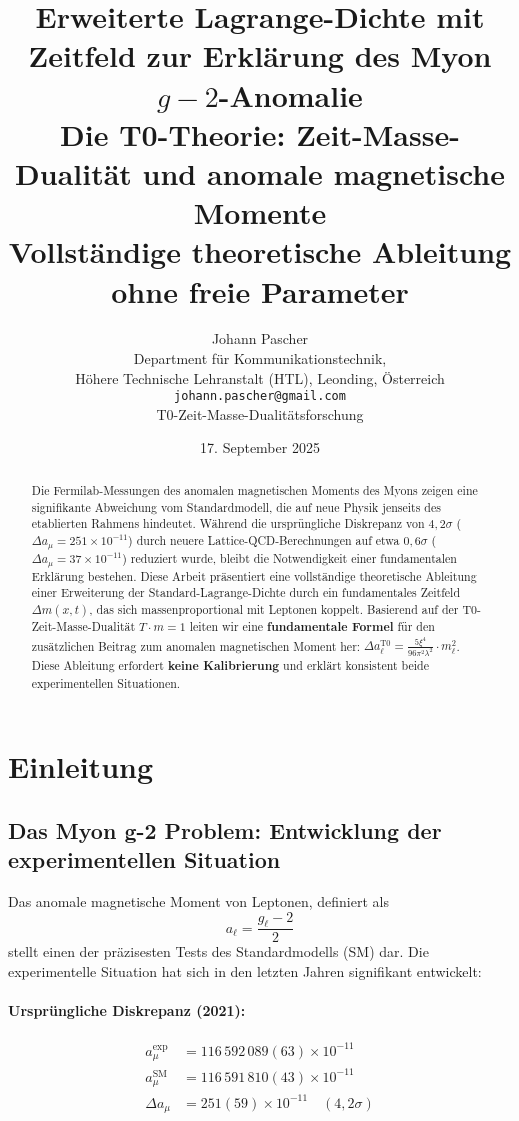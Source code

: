 \documentclass[12pt,a4paper]{article}
\title{\textbf{Erweiterte Lagrange-Dichte mit Zeitfeld zur Erklärung des Myon \(g-2\)-Anomalie}\\[0.5cm]
	\large Die T0-Theorie: Zeit-Masse-Dualität und anomale magnetische Momente\\[0.3cm]
	\normalsize Vollständige theoretische Ableitung ohne freie Parameter}
\author{Johann Pascher\\
	\small Department für Kommunikationstechnik,\\
	\small Höhere Technische Lehranstalt (HTL), Leonding, Österreich\\
	\small \texttt{johann.pascher@gmail.com}\\
	\small T0-Zeit-Masse-Dualitätsforschung}
\date{17. September 2025}
\theoremstyle{definition}
\begin{document}
	\maketitle
	\thispagestyle{fancy}
	
	\begin{abstract}
		Die Fermilab-Messungen des anomalen magnetischen Moments des Myons zeigen eine signifikante Abweichung vom Standardmodell, die auf neue Physik jenseits des etablierten Rahmens hindeutet. Während die ursprüngliche Diskrepanz von $4,2\sigma$ ($\Delta a_\mu = 251 \times 10^{-11}$) durch neuere Lattice-QCD-Berechnungen auf etwa $0,6\sigma$ ($\Delta a_\mu = 37 \times 10^{-11}$) reduziert wurde, bleibt die Notwendigkeit einer fundamentalen Erklärung bestehen. Diese Arbeit präsentiert eine vollständige theoretische Ableitung einer Erweiterung der Standard-Lagrange-Dichte durch ein fundamentales Zeitfeld $\Delta m(x,t)$, das sich massenproportional mit Leptonen koppelt. Basierend auf der T0-Zeit-Masse-Dualität $T \cdot m = 1$ leiten wir eine \textbf{fundamentale Formel} für den zusätzlichen Beitrag zum anomalen magnetischen Moment her: $\Delta a_\ell^{\text{T0}} = \frac{5\xi^4}{96\pi^2\lambda^2} \cdot m_\ell^2$. Diese Ableitung erfordert \textbf{keine Kalibrierung} und erklärt konsistent beide experimentellen Situationen.
	\end{abstract}
	
	\section{Einleitung}
	
	\subsection{Das Myon g-2 Problem: Entwicklung der experimentellen Situation}
	
	Das anomale magnetische Moment von Leptonen, definiert als
	\begin{equation}
		a_\ell = \frac{g_\ell - 2}{2}
	\end{equation}
	stellt einen der präzisesten Tests des Standardmodells (SM) dar. Die experimentelle Situation hat sich in den letzten Jahren signifikant entwickelt:
	
	\paragraph{Ursprüngliche Diskrepanz (2021):}
	\begin{align}
		a_\mu^{\text{exp}} &= 116\,592\,089(63) \times 10^{-11}\\
		a_\mu^{\text{SM}} &= 116\,591\,810(43) \times 10^{-11}\\
		\Delta a_\mu &= 251(59) \times 10^{-11} \quad (4,2\sigma) \label{eq:old_discrepancy}
	\end{align}
	
\end{document}
